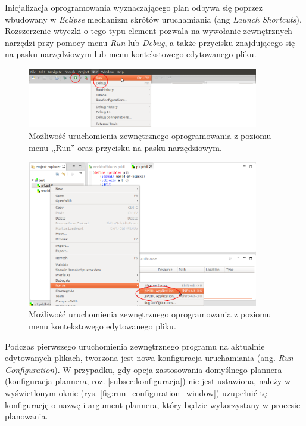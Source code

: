 Inicjalizacja oprogramowania wyznaczającego plan odbywa się poprzez wbudowany w \textit{Eclipse} mechanizm skrótów uruchamiania (ang \textit{Launch Shortcuts}). Rozszerzenie wtyczki o tego typu element pozwala na wywołanie zewnętrznych narzędzi przy pomocy menu \textit{Run} lub \textit{Debug}, a także przycisku znajdującego się na pasku narzędziowym lub menu kontekstowego edytowanego pliku.
\begin{figure}[h!]
    \centering
    \includegraphics[width=0.9\textwidth]{img/running_options_menu_toolbar}
    \caption{Możliwość uruchomienia zewnętrznego oprogramowania z poziomu menu ,,Run'' oraz przycisku na pasku narzędziowym.}
    \label{fig:running_options_menu_toolbar}
\end{figure}

\begin{figure}[h!]
    \centering
    \includegraphics[width=0.9\textwidth]{img/running_options_context_menu}
    \caption{Możliwość uruchomienia zewnętrznego oprogramowania z poziomu menu kontekstowego edytowanego pliku.}
    \label{fig:running_options_context_menu}
\end{figure}

Podczas pierwszego uruchomienia zewnętrznego programu na aktualnie edytowanych plikach, tworzona jest nowa konfiguracja uruchamiania (ang. \textit{Run Configuration}). W przypadku, gdy opcja zastosowania domyślnego plannera (konfiguracja plannera, roz. \ref{subsec:konfiguracja}) nie jest ustawiona, należy w wyświetlonym oknie (rys. \ref{fig:run_configuration_window}) uzupełnić tę konfigurację o nazwę i argument plannera, który będzie wykorzystany w procesie planowania. 

